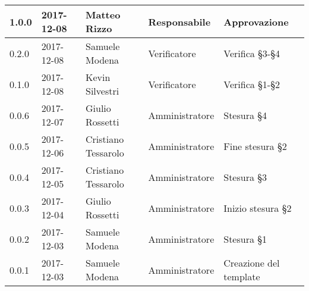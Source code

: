 \documentclass[./NormediProgetto.tex]{subfiles}
\begin{document}
\begin{longtable}{|p{20mm}|p{20mm}|p{40mm}|p{30mm}|p{50mm}|}
		\hline \hline
		
		1.0.0 & 2017-12-08 & Matteo Rizzo & Responsabile & Approvazione\\ \hline
		0.2.0 & 2017-12-08 & Samuele Modena & Verificatore & Verifica §3-§4\\ \hline
		0.1.0 & 2017-12-08 & Kevin Silvestri & Verificatore & Verifica §1-§2\\ \hline
		0.0.6 & 2017-12-07 & Giulio Rossetti & Amministratore & Stesura §4\\ \hline
		0.0.5 & 2017-12-06 & Cristiano Tessarolo & Amministratore & Fine stesura §2\\ \hline
		0.0.4 & 2017-12-05 & Cristiano Tessarolo & Amministratore & Stesura §3\\ \hline
		0.0.3 & 2017-12-04 & Giulio Rossetti & Amministratore & Inizio stesura §2\\ \hline
		0.0.2 & 2017-12-03 & Samuele Modena & Amministratore & Stesura §1\\ \hline
		0.0.1 & 2017-12-03 & Samuele Modena & Amministratore & Creazione del template\\ \hline
\end{longtable}
\end{document}
